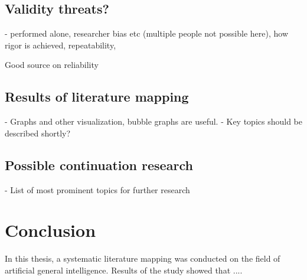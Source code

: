 \documentclass[utf8,english]{gradu3}
\begin{document}
\section{Validity threats?}

- performed alone, researcher bias etc (multiple people not possible here),
how rigor is achieved, repeatability, 

Good source on reliability \cite{wohlin2013}

\section{Results of literature mapping}
- Graphs and other visualization, bubble graphs are useful.
- Key topics should be described shortly?

\section{Possible continuation research}

- List of most prominent topics for further research

\chapter{Conclusion}
In this thesis, a systematic literature mapping was conducted on the field of
artificial general intelligence. Results of the study showed that .... 

\printbibliography
\end{document}
